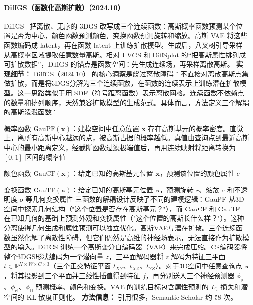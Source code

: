 \paragraph{DiffGS（函数化高斯扩散）（2024.10）}
DiffGS~\cite{2410_19657} 把离散、无序的 3DGS 改写成三个连续函数：高斯概率函数预测某个位置是否为中心，颜色函数预测颜色，变换函数预测旋转和缩放。高斯 VAE 将这些函数编码成 latent，再在函数 latent 上训练扩散模型。生成后，八叉树引导采样从高概率区域提取任意数量高斯。相对 UVGS 和 DiffSplat 的“把高斯属性排列成可扩散数据”，DiffGS 的锚点是函数空间：先生成连续场，再采样离散高斯。
\textbf{实现细节：} DiffGS（2024.10） 的核心洞察是绕过离散障碍：不直接对离散高斯点集做扩散，而是将3DGS分解为三个连续函数，在函数的连续表示上训练潜在扩散模型。这一思路类似于用 SDF（符号距离函数）表示离散网格。连续函数不依赖点的数量和排列顺序，天然兼容扩散模型的生成范式。具体而言，方法定义三个解耦的高斯泼溅函数：  \par  概率函数 $\mathrm{GauPF}(\mathbf{x})$：建模空间中任意位置 $\mathbf{x}$ 存在高斯基元的概率密度。直觉上，离所有高斯中心越远的点，被高斯占据的概率越低。真值由查询点到最近高斯中心的最小距离定义，经截断函数过滤极端值后，再用连续映射将距离转换为 $[0,1]$ 区间的概率值 \par  颜色函数 $\mathrm{GauCF}(\mathbf{x})$：给定已知的高斯基元位置 $\mathbf{x}$，预测该位置的颜色属性 $c$ \par  变换函数 $\mathrm{GauTF}(\mathbf{x})$：给定已知的高斯基元位置 $\mathbf{x}$，预测旋转 $r$、缩放 $s$ 和不透明度 $o$ 等几何变换属性  三函数的解耦设计反映了不同的建模逻辑：GauPF 从3D空间中探索几何结构（"这个位置是否存在高斯基元？"），而 GauCF 和 GauTF 在已知几何的基础上预测外观和变换属性（"这个位置的高斯长什么样？"）。这种分离使得几何生成和属性预测可以独立优化。高斯VAE与潜在扩散。三个连续函数虽然化解了离散性障碍，但它们仍然是高维的神经场表示，无法直接作为扩散模型的输入。DiffGS 训练一个高斯变分自编码器（VAE）来完成压缩。GS编码器将整个3DGS形状编码为一个潜向量 $z$，三平面解码器将 $z$ 解码为特征三平面 $t \in \mathbb{R}^{H \times W \times C \times 3}$（三个正交特征平面 $t_{XY}$、$t_{XZ}$、$t_{YZ}$）。对于3D空间中任意查询点 $\mathbf{x}$，将其投影到三个平面并三线性插值得到特征 $f$，再分别送入三个神经预测器 $\phi_{\mathrm{pf}}$、$\phi_{\mathrm{cf}}$、$\phi_{\mathrm{tf}}$ 预测概率、颜色和变换。VAE 的训练目标包含属性预测的 $L_1$ 损失和潜空间的 KL 散度正则化。
\textbf{方法信息：} 引用很多，Semantic Scholar 约 58 次。
